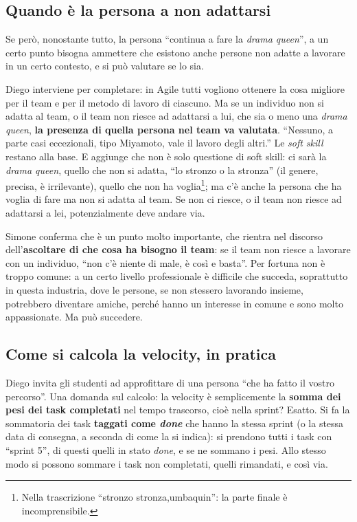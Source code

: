 \subsection{Quando è la persona a non adattarsi}

Se però, nonostante tutto, la persona ``continua a fare la \emph{drama
queen}'', a un certo punto bisogna ammettere che esistono anche persone non
adatte a lavorare in un certo contesto, e si può valutare se lo sia.

Diego interviene per completare: in Agile tutti vogliono ottenere la cosa
migliore per il team e per il metodo di lavoro di ciascuno. Ma se un individuo
non si adatta al team, o il team non riesce ad adattarsi a lui, che sia o
meno una \emph{drama queen}, \textbf{la presenza di quella persona nel team va
valutata}. ``Nessuno, a parte casi eccezionali, tipo Miyamoto, vale il lavoro
degli altri.'' Le \emph{soft skill} restano alla base. E aggiunge che non è
solo questione di soft skill: ci sarà la \emph{drama queen}, quello che non si
adatta, ``lo stronzo o la stronza'' (il genere, precisa, è irrilevante),
quello che non ha voglia\footnote{Nella trascrizione ``stronzo
stronza,umbaquin'': la parte finale è incomprensibile.}; ma c'è anche la
persona che ha voglia di fare ma non si adatta al team. Se non ci riesce, o il
team non riesce ad adattarsi a lei, potenzialmente deve andare via.

Simone conferma che è un punto molto importante, che rientra nel discorso
dell'\textbf{ascoltare di che cosa ha bisogno il team}: se il team non riesce
a lavorare con un individuo, ``non c'è niente di male, è così e basta''. Per
fortuna non è troppo comune: a un certo livello professionale è difficile che
succeda, soprattutto in questa industria, dove le persone, se non stessero
lavorando insieme, potrebbero diventare amiche, perché hanno un interesse in
comune e sono molto appassionate. Ma può succedere.

\subsection{Come si calcola la velocity, in pratica}

Diego invita gli studenti ad approfittare di una persona ``che ha fatto il
vostro percorso''. Una domanda sul calcolo: la velocity è semplicemente la
\textbf{somma dei pesi dei task completati} nel tempo trascorso, cioè nella
sprint? Esatto. Si fa la sommatoria dei task \textbf{taggati come
\emph{done}} che hanno la stessa sprint (o la stessa data di consegna, a
seconda di come la si indica): si prendono tutti i task con ``sprint 5'', di
questi quelli in stato \emph{done}, e se ne sommano i pesi. Allo stesso modo
si possono sommare i task non completati, quelli rimandati, e così via.

